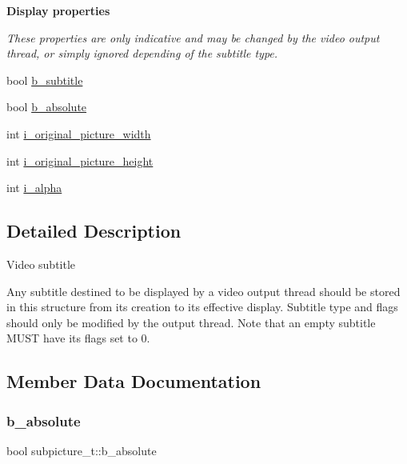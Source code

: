 \begin{Indent}\textbf{ Display properties}\par
{\em These properties are only indicative and may be changed by the video output thread, or simply ignored depending of the subtitle type. }\begin{DoxyCompactItemize}
\item 
bool \hyperlink{structsubpicture__t_a98a594fc9692d734dc8e13e7494827b0}{b\+\_\+subtitle}
\item 
bool \hyperlink{structsubpicture__t_af1e57a6804dc53ca4187ee2107abea56}{b\+\_\+absolute}
\item 
int \hyperlink{structsubpicture__t_af926c85504ebd196ed0afea2f367fa53}{i\+\_\+original\+\_\+picture\+\_\+width}
\item 
int \hyperlink{structsubpicture__t_aa8454e69113492d1497c82000376dc01}{i\+\_\+original\+\_\+picture\+\_\+height}
\item 
int \hyperlink{structsubpicture__t_a89bea0de7693c445807c939c325752ba}{i\+\_\+alpha}
\end{DoxyCompactItemize}
\end{Indent}


\subsection{Detailed Description}
Video subtitle

Any subtitle destined to be displayed by a video output thread should be stored in this structure from it\textquotesingle{}s creation to it\textquotesingle{}s effective display. Subtitle type and flags should only be modified by the output thread. Note that an empty subtitle M\+U\+ST have its flags set to 0. 

\subsection{Member Data Documentation}
\mbox{\label{structsubpicture__t_af1e57a6804dc53ca4187ee2107abea56}} 
\subsubsection{\texorpdfstring{b\+\_\+absolute}{b\_absolute}}
{\footnotesize\ttfamily bool subpicture\+\_\+t\+::b\+\_\+absolute}

